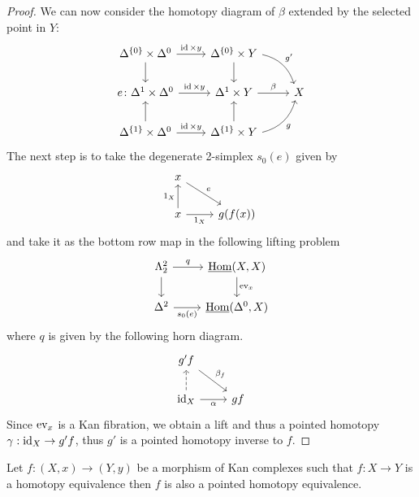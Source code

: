 \begin{proof}
    We can now consider the homotopy diagram of $\beta$ extended by the selected point in $Y$:
    \[
    \begin{tikzcd}
        \Delta^{\{0\}} \times \Delta^0
        \ar[r, "\id \times y"]
        \ar[d]
        &
        \Delta^{\{0\}} \times Y
        \ar[d]
        \ar[rd, bend left, "g'"]
        \\
        e\colon\Delta^1 \times \Delta^0
        \ar[r, "\id \times y"]
        &
        \Delta^1 \times Y
        \ar[r, "\beta"]
        &
        X
        \\
        \Delta^{\{1\}} \times \Delta^0
        \ar[u]
        \ar[r, "\id \times y"]
        &
        \Delta^{\{1\}} \times Y
        \ar[u]
        \ar[ru, bend right, "g"']
    \end{tikzcd}
    \]
    The next step is to take the degenerate 2-simplex $s_0(e)$ given by
    \[
    \begin{tikzcd}
        x
        \ar[rd, "e"]
        \\
        x 
        \ar[u, "1_X"]
        \ar[r, "1_X"']
        &
        g ( f ( x ) ) 
    \end{tikzcd}
    \]
    and take it as the bottom row map in the following lifting problem
    \[
    \begin{tikzcd}
        \Lambda_2^2
        \ar[d]
        \ar[r, "q"]
        &
        \underline{\Hom}  ( X , X )
        \ar[d, "\ev_x"]
        \\
        \Delta^2
        \ar[r,"s_0(e)"']
        &
        \underline{\Hom} ( \Delta^0 , X )
    \end{tikzcd}
    \]
    where $q$ is given by the following horn diagram.
    \[
    \begin{tikzcd}
        g'f
        \ar[rd, "\beta_f"]
        \\
        \id_X
        \ar[ u , dashed]
        \ar[r, " \alpha"']
        &
        gf
    \end{tikzcd}
    \]
    Since $\operatorname{ev}_x$ is a Kan fibration, we obtain a lift and thus a pointed homotopy $\gamma:\operatorname{id}_X \to g'f $, thus $g'$ is a pointed homotopy inverse to $f$.
\end{proof}

\begin{cor}
\label{htpy eq. then pointed htpy eq.}
    Let $f\colon (X,x) \to (Y,y)$ be a morphism of Kan complexes such that $f \colon X \to Y$ is a homotopy equivalence then $f$ is also a pointed homotopy equivalence.
\end{cor}

